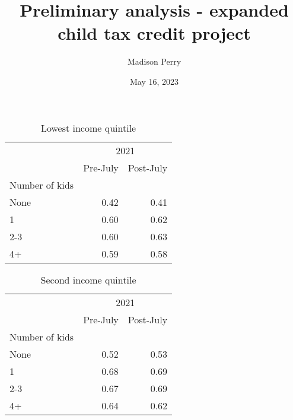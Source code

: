 \documentclass{article}
\title{Preliminary analysis - expanded child tax credit project}
\author{Madison Perry}
\date{May 16, 2023}
\begin{document}
	\maketitle
	
\begin{table}[!h]
	\centering
	\caption{Lowest income quintile}
\begin{tabular}{lll}
	\cline{1-3}
	\multicolumn{1}{c}{} &
	\multicolumn{2}{|c}{2021} \\
	\multicolumn{1}{c}{} &
	\multicolumn{1}{|r}{Pre-July} &
	\multicolumn{1}{r}{Post-July} \\
	\cline{1-3}
	\multicolumn{1}{l}{Number of kids} &
	\multicolumn{1}{|r}{} &
	\multicolumn{1}{r}{} \\
	\multicolumn{1}{l}{\hspace{1em}None} &
	\multicolumn{1}{|r}{0.42} &
	\multicolumn{1}{r}{0.41} \\
	\multicolumn{1}{l}{\hspace{1em}1} &
	\multicolumn{1}{|r}{0.60} &
	\multicolumn{1}{r}{0.62} \\
	\multicolumn{1}{l}{\hspace{1em}2-3} &
	\multicolumn{1}{|r}{0.60} &
	\multicolumn{1}{r}{0.63} \\
	\multicolumn{1}{l}{\hspace{1em}4+} &
	\multicolumn{1}{|r}{0.59} &
	\multicolumn{1}{r}{0.58} \\
	\cline{1-3}
\end{tabular}
\end{table}

\begin{table}[!h]
	\centering
		\caption{Second income quintile}
\begin{tabular}{lll}
	\cline{1-3}
	\multicolumn{1}{c}{} &
	\multicolumn{2}{|c}{2021} \\
	\multicolumn{1}{c}{} &
	\multicolumn{1}{|r}{Pre-July} &
	\multicolumn{1}{r}{Post-July} \\
	\cline{1-3}
	\multicolumn{1}{l}{Number of kids} &
	\multicolumn{1}{|r}{} &
	\multicolumn{1}{r}{} \\
	\multicolumn{1}{l}{\hspace{1em}None} &
	\multicolumn{1}{|r}{0.52} &
	\multicolumn{1}{r}{0.53} \\
	\multicolumn{1}{l}{\hspace{1em}1} &
	\multicolumn{1}{|r}{0.68} &
	\multicolumn{1}{r}{0.69} \\
	\multicolumn{1}{l}{\hspace{1em}2-3} &
	\multicolumn{1}{|r}{0.67} &
	\multicolumn{1}{r}{0.69} \\
	\multicolumn{1}{l}{\hspace{1em}4+} &
	\multicolumn{1}{|r}{0.64} &
	\multicolumn{1}{r}{0.62} \\
	\cline{1-3}
\end{tabular}
\end{table}
	
\end{document}
